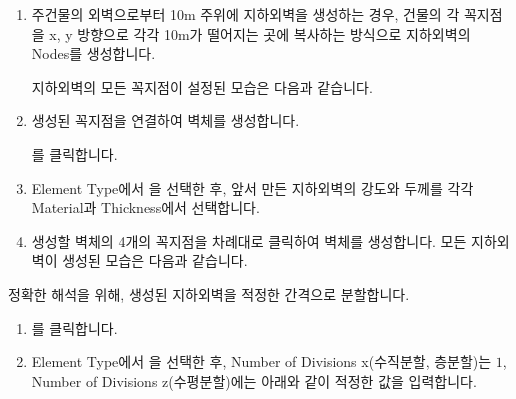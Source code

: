 \documentclass[a4paper,11pt,korean,openany,oneside]{sphinxmanual}
\begin{document}
\begin{sphinxShadowBox}
\begin{enumerate}
\item {} 
\sphinxAtStartPar
주건물의 외벽으로부터 10m 주위에 지하외벽을 생성하는 경우,
건물의 각 꼭지점을 x, y 방향으로 각각 10m가 떨어지는 곳에 복사하는 방식으로 지하외벽의 Nodes를 생성합니다.

\sphinxAtStartPar
지하외벽의 모든 꼭지점이 설정된 모습은 다음과 같습니다.

\newpage

\begin{center}
\noindent{}
\end{center}

\item {} 
\sphinxAtStartPar
생성된 꼭지점을 연결하여 벽체를 생성합니다.

\sphinxAtStartPar
{} \sphinxhyphen{} 를 클릭합니다.

\item {} 
\sphinxAtStartPar
Element Type에서 을 선택한 후, 앞서 만든 지하외벽의 강도와 두께를 각각 Material과 Thickness에서 선택합니다.

\newpage

\begin{center}
\noindent{}
\end{center}

\item {} 
\sphinxAtStartPar
생성할 벽체의 4개의 꼭지점을 차례대로 클릭하여 벽체를 생성합니다. 모든 지하외벽이 생성된 모습은 다음과 같습니다.

\newpage

\begin{center}
\noindent{}
\end{center}

\end{enumerate}

\sphinxAtStartPar
정확한 해석을 위해, 생성된 지하외벽을 적정한 간격으로 분할합니다.
\begin{enumerate}
%
\setcounter{enumi}{9}
\item {} 
\sphinxAtStartPar
{} \sphinxhyphen{} 를 클릭합니다.

\item {} 
\sphinxAtStartPar
Element Type에서 을 선택한 후, Number of Divisions x(수직분할, 층분할)는 \(1\),
Number of Divisions z(수평분할)에는 아래와 같이 적정한 값을 입력합니다.


\end{enumerate}
\end{sphinxShadowBox}
\end{document}
